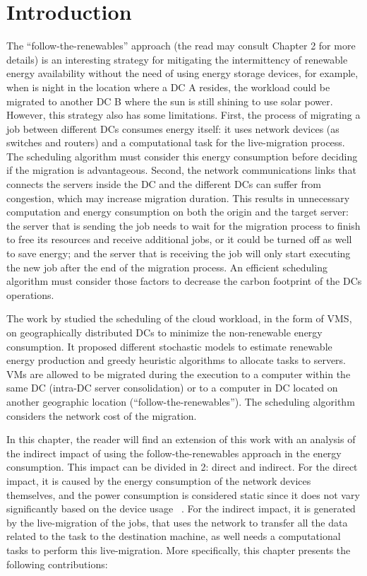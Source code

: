 \section{Introduction}

The ``follow-the-renewables'' approach (the read may consult Chapter 2 for more details) is an interesting strategy for mitigating the intermittency of renewable energy availability without the need of using energy storage devices, for example, when is night in the location where a DC A resides, the workload could be migrated to another DC B where the sun is still shining to use solar power. However, this strategy also has some limitations. First, the process of migrating a job between different DCs consumes energy itself: it uses network devices (as switches and routers) and a computational task for the live-migration process. The scheduling algorithm must consider this energy consumption before deciding if the migration is advantageous. Second, the network communications links that connects the servers inside the DC and the different DCs can suffer from congestion, which may increase migration duration. This results in unnecessary computation and energy consumption on both the origin and the target server: the server that is sending the job needs to wait for the migration process to finish to free its resources and receive additional jobs, or it could be turned off as well to save energy; and the server that is receiving the job will only start executing the new job after the end of the migration process. An efficient scheduling algorithm must consider those factors to decrease the carbon footprint of the DCs operations.

The work by \cite{SAGITTA,NEMESIS} studied the scheduling of the cloud workload, in the form of VMS, on geographically distributed DCs to minimize the non-renewable energy consumption. It proposed different stochastic models to estimate renewable energy production and greedy heuristic algorithms to allocate tasks to servers. VMs are allowed to be migrated during the execution to a computer within the same DC (intra-DC server consolidation)  or to a computer in DC located on another geographic location (``follow-the-renewables''). The scheduling algorithm considers the network cost of the migration.

In this chapter, the reader will find an extension of this work with an analysis of the indirect impact of using the follow-the-renewables approach in the energy consumption. This impact can be divided in 2: direct and indirect. For the direct impact, it is caused by the energy consumption of the network devices themselves, and the power consumption is considered static since it does not vary significantly based on the device usage ~\cite{energy_network_devices}. For the indirect impact, it is generated by the live-migration of the jobs, that uses the network to transfer all the data related to the task to the destination machine, as well needs a computational tasks to perform this live-migration.  More specifically, this chapter presents the following contributions:

